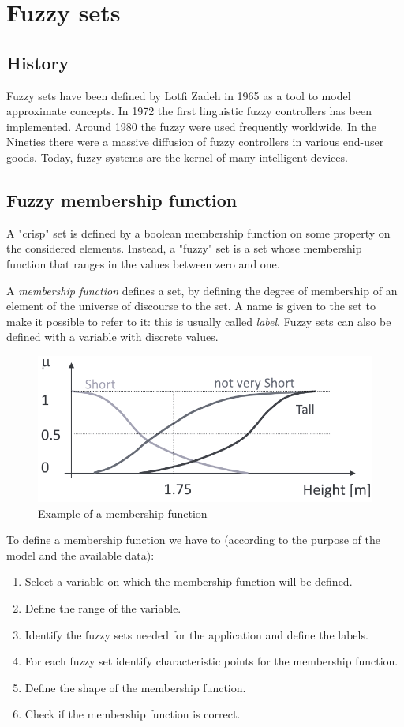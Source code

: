 \documentclass[12pt, a4paper]{report}
\newtheorem[style=M,bodystyle=\normalfont]{theorem}{Theorem}
\newtheorem[style=M,bodystyle=\normalfont]{corollary}{Corollary}
\newtheorem[style=M,bodystyle=\normalfont]{lemma}{Lemma}
\newtheorem[style=M,bodystyle=\normalfont]{definition}{Definition}
\begin{document}
    \newpage

    \chapter{Fuzzy sets}
    \section{History}
    Fuzzy sets have been defined by Lotfi Zadeh in 1965 as a tool to model approximate concepts. In 1972 the first linguistic fuzzy
    controllers has been implemented. Around 1980 the fuzzy were used frequently worldwide. In the Nineties there were a massive 
    diffusion of fuzzy controllers in various end-user goods. Today, fuzzy systems are the kernel of many intelligent devices. 

    \section{Fuzzy membership function}
    A "crisp" set is defined by a boolean membership function on some property on the considered elements. Instead, a "fuzzy" set is
    a set whose membership function that ranges in the values between zero and one.
    \begin{definition}
        A \emph{membership function} defines a set, by defining the degree of membership of an element of the universe of discourse 
        to the set. A name is given to the set to make it possible to refer to it: this is usually called \emph{label}. Fuzzy sets can 
        also be defined with a variable with discrete values. 
    \end{definition}
    \begin{figure}[H]
        \centering
        \includegraphics[width=0.50\linewidth]{images/function.png}
        \caption{Example of a membership function}
    \end{figure}
    To define a membership function we have to (according to the purpose of the model and the available data):
    \begin{enumerate}
        \item Select a variable on which the membership function will be defined. 
        \item Define the range of the variable.
        \item Identify the fuzzy sets needed for the application and define the labels. 
        \item For each fuzzy set identify characteristic points for the membership function.
        \item Define the shape of the membership function.
        \item Check if the membership function is correct.
    \end{enumerate}
\end{document}
